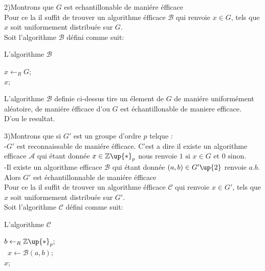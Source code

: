 \documentclass[10pt]{beamer}
\begin{document}
\begin{frame}

2)Montrons que $G$ est echantillonable de mani\'{e}re \'{e}fficace 
\\Pour ce la il suffit de trouver un algorithme \'{e}fficace $\mathcal{B}$ qui renvoie $x \in G$, tels que $x$ soit uniformement distribu\'{e}e sur $G$. 
\\Soit l'algorithme  $\mathcal{B}$ d\'{e}fini comme suit:

\begin{algorithm}[H]
\DontPrintSemicolon
\caption{L'algorithme $\mathcal{B}$}
\BlankLine
$x \gets _{R} G;$\\
\Return $x;$
\end{algorithm}

L'algorithme $\mathcal{B}$ definie ci-dessus tire un \'{e}lement de $G$ de mani\'{e}re uniform\'{e}ment al\'{e}atoire, de mani\'{e}re \'{e}fficace d'ou $G$ est \'{e}chantillonable de maniere efficace.
\\D'ou le resultat.

\end{frame}


\begin{frame}

3)Montrons que si $G'$ est un groupe d'ordre $p$ telque :
\\-$G'$ est reconnaissable de mani\'{e}re \'{e}fficace. C'est a dire il existe un algorithme efficace $\mathcal{A}$ qui \'{e}tant donn\'{e}e $x \in \mathbb{Z\up{*}}_{p}$ nous renvoie $1 \text{ si } x \in G \text{ et } 0 \text{ sinon}$.
\\-Il existe un algorithme efficace $\mathcal{B}$ qui \'{e}tant donn\'{e}e $(a, b) \in G'\up{2}$ renvoie $a.b$.
\\Alors $G'$ est \'{e}chantillonnable de mani\'{e}re \'{e}fficace 
\\Pour ce la il suffit de trouver un algorithme \'{e}fficace $\mathcal{C}$ qui renvoie $x \in G'$, tels que $x$ soit uniformement distribu\'{e}e sur $G'$. 
\\Soit l'algorithme  $\mathcal{C}$ d\'{e}fini comme suit:

\begin{algorithm}[H]
\DontPrintSemicolon
\caption{L'algorithme $\mathcal{C}$}
\BlankLine
$b \gets _{R} \mathbb{Z\up{*}}_{p};$\\
\
$x \gets \mathcal{B}(a,b);$\\
\Return $x;$
\end{algorithm}




\end{frame}
\end{document}
